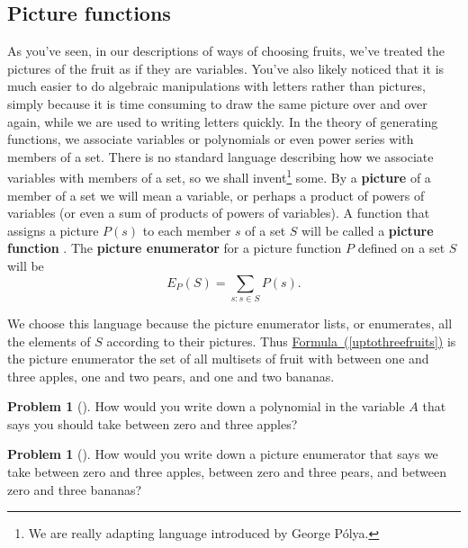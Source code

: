 \documentclass[10pt,]{book}
\newcommand{\terminology}[1]{\textbf{#1}}
\theoremstyle{plain}
\theoremstyle{definition}
\newtheorem{activity}[project]{Problem}
\theoremstyle{definition}
\numberwithin{equation}{chapter}
\begin{document}
\subsection[{Picture functions}]{Picture functions}\label{picturefunction}
\hypertarget{p-1054}{}%
As you've seen, in our descriptions of ways of choosing fruits, we've treated the pictures of the fruit as if they are variables. You've also likely noticed that it is much easier to do algebraic manipulations with letters rather than pictures, simply because it is time consuming to draw the same picture over and over again, while we are used to writing letters quickly. In the theory of generating functions, we associate variables or polynomials or even power series with members of a set. There is no standard language describing how we associate variables with members of a set, so we shall invent\footnote{We are really adapting language introduced by George Pólya.\label{fn-10}} some. By a \terminology{picture} of a member of a set we will mean a variable, or perhaps a product of powers of variables (or even a sum of products of powers of variables). A function that assigns a picture \(P(s)\) to each member \(s\) of a set \(S\) will be called a \terminology{picture function} . The \terminology{picture enumerator} for a picture function \(P\) defined on a set \(S\) will be%
\begin{equation*}
E_P(S) = \sum_{s: s\in S}  P(s).
\end{equation*}
%
\par
\hypertarget{p-1055}{}%
We choose this language because the picture enumerator lists, or enumerates, all the elements of \(S\) according to their pictures. Thus \hyperref[uptothreefruits]{Formula~(\ref{uptothreefruits})} is the picture enumerator the set of all multisets of fruit with between one and three apples, one and two pears, and one and two bananas.%
\begin{activity}[] \label{zerotothreeapples}
\hypertarget{p-1056}{}%
How would you write down a polynomial in the variable \(A\) that says you should take between zero and three apples?%
\end{activity}
\begin{activity}[] \label{zerotothreefruits}
\hypertarget{p-1058}{}%
How would you write down a picture enumerator that says we take between zero and three apples, between zero and three pears, and between zero and three bananas?%
\end{activity}
\end{document}
